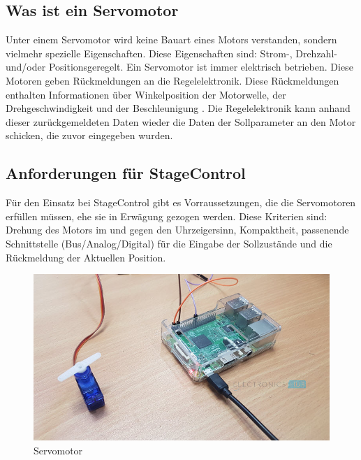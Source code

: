 \subsection{Was ist ein Servomotor}
Unter einem Servomotor wird keine Bauart eines Motors verstanden, sondern vielmehr spezielle Eigenschaften. Diese Eigenschaften sind: Strom-, Drehzahl- und/oder Positionsgeregelt. Ein Servomotor ist immer elektrisch betrieben. Diese Motoren geben Rückmeldungen an die Regelelektronik. Diese Rückmeldungen enthalten Informationen über Winkelposition der Motorwelle, der Drehgeschwindigkeit und der Beschleunigung \parencite{ServomotorInfo}. Die Regelelektronik kann anhand dieser zurückgemeldeten Daten wieder die Daten der Sollparameter an den Motor schicken, die zuvor eingegeben wurden. \\


\subsection{Anforderungen für StageControl}
Für den Einsatz bei StageControl gibt es Vorraussetzungen, die die Servomotoren erfüllen müssen, ehe sie in Erwägung gezogen werden. Diese Kriterien sind: Drehung des Motors im und gegen den Uhrzeigersinn, Kompaktheit, passenende Schnittstelle (Bus/Analog/Digital) für die Eingabe der Sollzustände und die Rückmeldung der Aktuellen Position.

\begin{figure}[H]
	\centering
	\includegraphics[width=0.7\linewidth]{images/servo.jpg}
	\caption[Servomotor]{Servomotor}
	\label{fig:Servo}
\end{figure}

